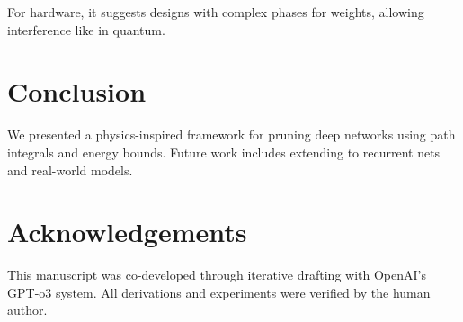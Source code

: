 \documentclass[11pt]{article}
\begin{document}
For hardware, it suggests designs with complex phases for weights, allowing interference like in quantum.

\section{Conclusion}
We presented a physics-inspired framework for pruning deep networks using path integrals and energy bounds. Future work includes extending to recurrent nets and real-world models.

\section*{Acknowledgements}
This manuscript was co-developed through iterative drafting with OpenAI’s GPT-o3 system. All derivations and experiments were verified by the human author.



\end{document}

